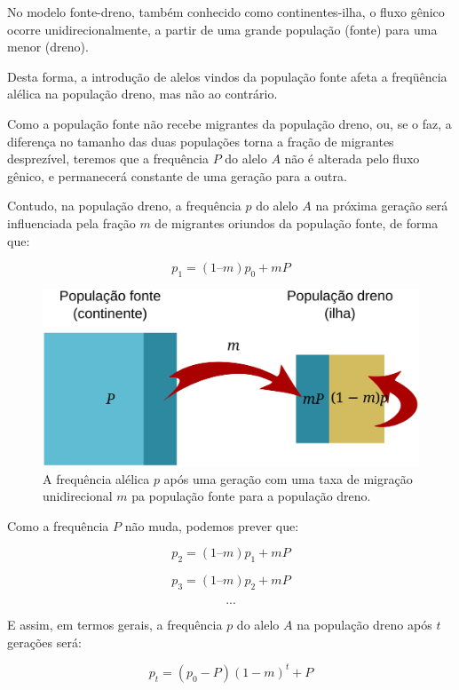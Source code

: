\documentclass[
]{book}
\begin{document}
No modelo fonte-dreno, também conhecido como continentes-ilha, o fluxo gênico ocorre unidirecionalmente, a partir de uma grande população (fonte) para uma menor (dreno).

Desta forma, a introdução de alelos vindos da população fonte afeta a freqüência alélica na população dreno, mas não ao contrário.

Como a população fonte não recebe migrantes da população dreno, ou, se o faz, a diferença no tamanho das duas populações torna a fração de migrantes desprezível, teremos que a frequência \(P\) do alelo \(A\) não é alterada pelo fluxo gênico, e permanecerá constante de uma geração para a outra.

Contudo, na população dreno, a frequência \(p\) do alelo \(A\) na próxima geração será influenciada pela fração \(m\) de migrantes oriundos da população fonte, de forma que:

\[p_1 = (1 – m)p_0 + mP\]

\begin{figure}

{\centering \includegraphics[width=600px]{figs/migration_unidirectional} 

}

\caption{A frequência alélica $p$ após uma geração com uma taxa de migração unidirecional $m$ pa população fonte para a população dreno.}\label{fig:migration1way}
\end{figure}

Como a frequência \(P\) não muda, podemos prever que:

\[p_2 = (1 – m)p_1 + mP\]

\[p_3 = (1 – m)p_2 + mP\]

\[...\]

E assim, em termos gerais, a frequência \(p\) do alelo \(A\) na população dreno após \(t\) gerações será:

\[p_t = (p_0 - P)(1 - m)^t+ P\]
\end{document}
